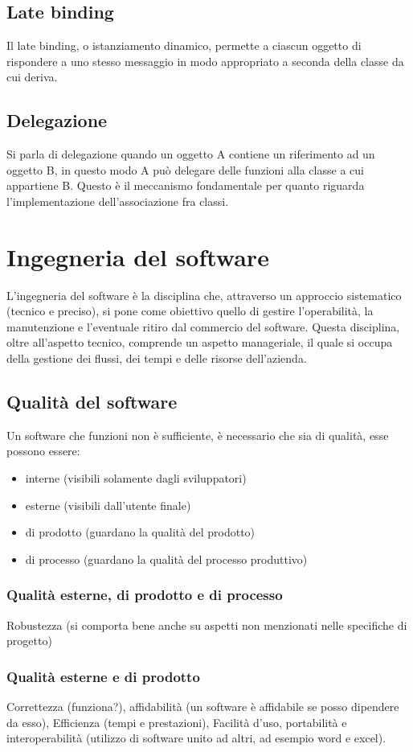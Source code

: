 \documentclass[a4paper,12pt]{report}
\begin{document}
	\section{Late binding}
	Il late binding, o istanziamento dinamico, permette a ciascun oggetto di rispondere a uno stesso messaggio in modo appropriato a seconda della classe da cui deriva.
	\section{Delegazione}
	Si parla di delegazione quando un oggetto A contiene un riferimento ad un oggetto B, in questo modo A può delegare delle funzioni alla classe a cui appartiene B. Questo è il meccanismo fondamentale per quanto riguarda l'implementazione dell'associazione fra classi.
	\chapter{Ingegneria del software}
	L'ingegneria del software è la disciplina che, attraverso un approccio sistematico (tecnico e preciso), si pone come obiettivo quello di gestire l'operabilità, la manutenzione e l'eventuale ritiro dal commercio del software. Questa disciplina, oltre all'aspetto tecnico, comprende un aspetto manageriale, il quale si occupa della gestione dei flussi, dei tempi e delle risorse dell'azienda.
	\section{Qualità del software}
	Un software che funzioni non è sufficiente, è necessario che sia di qualità, esse possono essere:
	\begin{itemize}
		\item interne (visibili solamente dagli sviluppatori)
		\item esterne (visibili dall'utente finale)
		\item di prodotto (guardano la qualità del prodotto)
		\item di processo (guardano la qualità del processo produttivo)
	\end{itemize}
	\subsection{Qualità esterne, di prodotto e di processo}
	Robustezza (si comporta bene anche su aspetti non menzionati nelle specifiche di progetto)
	\subsection{Qualità esterne e di prodotto}
	Correttezza (funziona?), affidabilità (un software è affidabile se posso dipendere da esso), Efficienza (tempi e prestazioni), Facilità d'uso, portabilità e interoperabilità (utilizzo di software unito ad altri, ad esempio word e excel).
\end{document}

